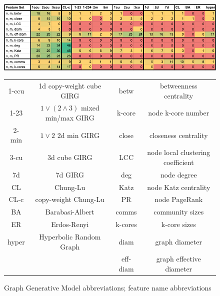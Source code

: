 \begin{figure}
    \centering
    \includegraphics[width=\textwidth]{./figures/Blasius_framework_table.png}
    \caption{\cite{blasius2018towards} GGM comparison framework on Facebook graphs, extended to different GIRG models.
    Some models are missing from the table e.g. 3d-6d GIRGs as their results follow a trend from low to high dimension.
    }
    \label{fig:blasius_framework_table}
    \vspace{1em}
    \centering
    \begin{tabular}{|c|c||c|c|}
        \hline
        1-ccu & 1d copy-weight cube GIRG 
        & betw & betweenness centrality
        \\
        1-23 & $1 \lor (2 \land 3)$ mixed min/max GIRG
        & k-core & node k-core number
        \\
        2-min & $1 \lor 2$ 2d min GIRG
        & close & closeness centrality
        \\
        3-cu & 3d cube GIRG
        & LCC & node local clustering coefficient
        \\
        7d & 7d GIRG
        & deg & node degree
        \\
        CL & Chung-Lu
        & Katz & node Katz centrality
        \\
        CL-c & copy-weight Chung-Lu
        & PR & node PageRank
        \\
        BA & Barabasi-Albert
        & comms & community sizes
        \\
        ER & Erdos-Renyi
        & k-cores & k-core sizes
        \\
        hyper & Hyperbolic Random Graph &
        diam & graph diameter
        \\
        && eff-diam & graph effective diameter\\
        \hline
    \end{tabular}
    \caption{Graph Generative Model abbreviations; feature name abbreviations}
\end{figure}

